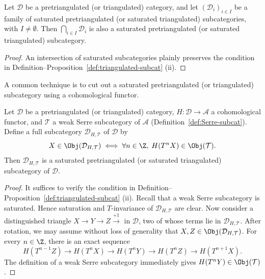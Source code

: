 \begin{proposition}\label{prop:triangulated-subcat-intersection}
	Let $\mathcal{D}$ be a pretriangulated (or triangulated) category, and let
	$(\mathcal{D}_i)_{i \in I}$ be a family of saturated pretriangulated (or
	saturated triangulated) subcategories, with $I \neq \emptyset$. Then
	$\bigcap_{i \in I} \mathcal{D}_i$ is also a saturated pretriangulated (or
	saturated triangulated) subcategory.
\end{proposition}

\begin{proof}
	An intersection of saturated subcategories plainly preserves the
	condition in Definition--Proposition~\ref{def:triangulated-subcat} (ii).
\end{proof}

A common technique is to cut out a saturated pretriangulated (or
triangulated) subcategory using a cohomological functor.

\begin{proposition}\label{prop:cut-subcat-by-cohomologies}
	Let $\mathcal{D}$ be a pretriangulated (or triangulated) category,
	$H: \mathcal{D} \to \mathcal{A}$ a cohomological functor, and
	$\mathcal{T}$ a weak Serre subcategory of $\mathcal{A}$
	(Definition~\ref{def:Serre-subcat}). Define a full subcategory
	$\mathcal{D}_{H, \mathcal{T}}$ of $\mathcal{D}$ by
	\[ X \in \Obj(\mathcal{D}_{H, \mathcal{T}}) \iff \forall n \in \Z, \; H(T^n X) \in \Obj(\mathcal{T}). \]
	Then $\mathcal{D}_{H, \mathcal{T}}$ is a saturated pretriangulated (or
	saturated triangulated) subcategory of $\mathcal{D}$.
\end{proposition}

\begin{proof}
	It suffices to verify the condition in
	Definition--Proposition~\ref{def:triangulated-subcat} (ii). Recall that a
	weak Serre subcategory is saturated. Hence saturation and $T$-invariance
	of $\mathcal{D}_{H, \mathcal{T}}$ are clear. Now consider a distinguished
	triangle $X \to Y \to Z \xrightarrow{+1}$ in $\mathcal{D}$, two of whose
	terms lie in $\mathcal{D}_{H, \mathcal{T}}$. After rotation, we may assume
	without loss of generality that
	$X, Z \in \Obj(\mathcal{D}_{H, \mathcal{T}})$. For every $n \in \Z$,
	there is an exact sequence
	\[ H(T^{n-1} Z) \to H(T^n X) \to H(T^n Y) \to H(T^n Z) \to H(T^{n+1} X). \]
	The definition of a weak Serre subcategory immediately gives
	$H(T^n Y) \in \Obj(\mathcal{T})$.
\end{proof}

